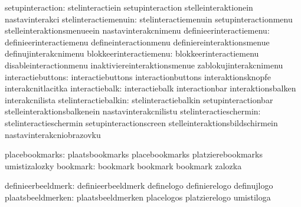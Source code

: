              setupinteraction:  stelinteractiein             setupinteraction
                                stelleinteraktionein         nastavinterakci
         stelinteractiemenuin:  stelinteractiemenuin         setupinteractionmenu
                                stelleinteraktionsmenueein   nastavinterakcnimenu
      definieerinteractiemenu:  definieerinteractiemenu      defineinteractionmenu
                                definiereinteraktionsmenue   definujinterakcnimenu
       blokkeerinteractiemenu:  blokkeerinteractiemenu       disableinteractionmenu
                                inaktiviereinteraktionsmenue zablokujinterakcnimenu
            interactiebuttons:  interactiebuttons            interactionbuttons
                                interaktionsknopfe           interakcnitlacitka
               interactiebalk:  interactiebalk               interactionbar
                                interaktionsbalken           interakcnilista
         stelinteractiebalkin:  stelinteractiebalkin         setupinteractionbar
                                stelleinteraktionsbalkenein  nastavinterakcnilistu
       stelinteractieschermin:  stelinteractieschermin       setupinteractionscreen
                                stelleinteraktionsbildschirmein nastavinterakcniobrazovku

               placebookmarks:  plaatsbookmarks              placebookmarks
                                platzierebookmarks           umistizalozky
                     bookmark:  bookmark                     bookmark
                                bookmark                     zalozka

           definieerbeeldmerk:  definieerbeeldmerk           definelogo
                                definierelogo                definujlogo
            plaatsbeeldmerken:  plaatsbeeldmerken            placelogos
                                platzierelogo                umistiloga

